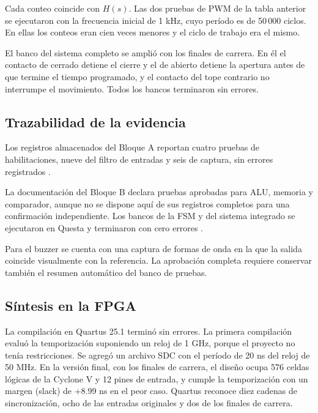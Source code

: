 \documentclass[12pt,letterpaper]{article}
\begin{document}
Cada conteo coincide con $H(s)$. Las dos pruebas de PWM
de la tabla anterior se ejecutaron con la frecuencia
inicial de 1 kHz, cuyo período es de 50\,000 ciclos. En
ellas los conteos eran cien veces menores y el ciclo de
trabajo era el mismo.

El banco del sistema completo se amplió con los finales de
carrera. En él el contacto de cerrado detiene el cierre y
el de abierto detiene la apertura antes de que termine el
tiempo programado, y el contacto del tope contrario no
interrumpe el movimiento. Todos los bancos terminaron sin
errores.

\subsection{Trazabilidad de la evidencia}

Los registros almacenados del Bloque A reportan
cuatro pruebas de habilitaciones, nueve del filtro de
entradas y seis de captura, sin errores registrados
\cite{transcriptA}.

La documentación del Bloque B declara pruebas aprobadas
para ALU, memoria y comparador, aunque no se dispone aquí
de sus registros completos para una confirmación
independiente. Los bancos de la FSM y del sistema
integrado se ejecutaron en Questa y terminaron con cero
errores \cite{docsBC}.

Para el buzzer se cuenta con una captura de formas de onda
en la que la salida coincide visualmente con la referencia.
La aprobación completa requiere conservar también el
resumen automático del banco de pruebas.


\subsection{Síntesis en la FPGA}

La compilación en Quartus 25.1 terminó sin errores. La
primera compilación evaluó la temporización suponiendo un
reloj de 1 GHz, porque el proyecto no tenía restricciones.
Se agregó un archivo SDC con el período de 20 ns del
reloj de 50 MHz. En la versión final, con los finales
de carrera, el diseño ocupa 576 celdas lógicas de la
Cyclone V y 12 pines de entrada, y cumple la temporización
con un margen (slack) de +8.99 ns en el peor caso. Quartus
reconoce diez cadenas de sincronización, ocho de las
entradas originales y dos de los finales de carrera.
\end{document}
